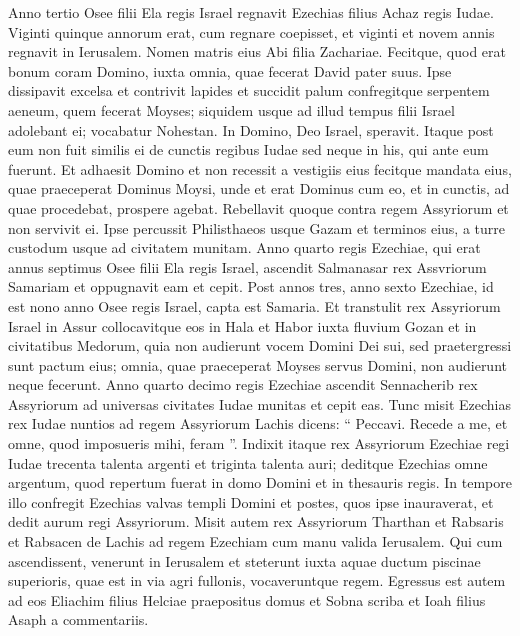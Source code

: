 \begin{biblechapter}
\begin{biblechapter}
\begin{biblechapter}
\begin{biblechapter}
\begin{biblechapter}
\begin{biblechapter}
\begin{biblechapter}
\begin{biblechapter}
\begin{biblechapter}
\begin{biblechapter}
\begin{biblechapter}
\begin{biblechapter}
\begin{biblechapter}
\begin{biblechapter}
\begin{biblechapter}
\begin{biblechapter}
\begin{biblechapter}
\begin{biblechapter}
 \verse Anno tertio Osee filii Ela regis Israel regnavit Ezechias filius Achaz regis Iudae. 
\verse Viginti quinque annorum erat, cum regnare coepisset, et viginti et novem annis regnavit in Ierusalem. Nomen matris eius Abi filia Zachariae. 
\verse Fecitque, quod erat bonum coram Domino, iuxta omnia, quae fecerat David pater suus. 
\verse Ipse dissipavit excelsa et contrivit lapides et succidit palum confregitque serpentem aeneum, quem fecerat Moyses; siquidem usque ad illud tempus filii Israel adolebant ei; vocabatur Nohestan. 
\verse In Domino, Deo Israel, speravit. Itaque post eum non fuit similis ei de cunctis regibus Iudae sed neque in his, qui ante eum fuerunt. 
\verse Et adhaesit Domino et non recessit a vestigiis eius fecitque mandata eius, quae praeceperat Dominus Moysi, 
\verse unde et erat Dominus cum eo, et in cunctis, ad quae procedebat, prospere agebat.
 Rebellavit quoque contra regem Assyriorum et non servivit ei. 
\verse Ipse percussit Philisthaeos usque Gazam et terminos eius, a turre custodum usque ad civitatem munitam.
 \verse Anno quarto regis Ezechiae, qui erat annus septimus Osee filii Ela regis Israel, ascendit Salmanasar rex Assvriorum Samariam et oppugnavit eam 
\verse et cepit. Post annos tres, anno sexto Ezechiae, id est nono anno Osee regis Israel, capta est Samaria. 
\verse Et transtulit rex Assyriorum Israel in Assur collocavitque eos in Hala et Habor iuxta fluvium Gozan et in civitatibus Medorum, 
\verse quia non audierunt vocem Domini Dei sui, sed praetergressi sunt pactum eius; omnia, quae praeceperat Moyses servus Domini, non audierunt neque fecerunt.
 \verse Anno quarto decimo regis Ezechiae ascendit Sennacherib rex Assyriorum ad universas civitates Iudae munitas et cepit eas. 
\verse Tunc misit Ezechias rex Iudae nuntios ad regem Assyriorum Lachis dicens: “ Peccavi. Recede a me, et omne, quod imposueris mihi, feram ”. Indixit itaque rex Assyriorum Ezechiae regi Iudae trecenta talenta argenti et triginta talenta auri; 
\verse deditque Ezechias omne argentum, quod repertum fuerat in domo Domini et in thesauris regis. 
\verse In tempore illo confregit Ezechias valvas templi Domini et postes, quos ipse inauraverat, et dedit aurum regi Assyriorum.
 \verse Misit autem rex Assyriorum Tharthan et Rabsaris et Rabsacen de Lachis ad regem Ezechiam cum manu valida Ierusalem. Qui cum ascendissent, venerunt in Ierusalem et steterunt iuxta aquae ductum piscinae superioris, quae est in via agri fullonis, 
\verse vocaveruntque regem. Egressus est autem ad eos Eliachim filius Helciae praepositus domus et Sobna scriba et Ioah filius Asaph a commentariis.

\end{biblechapter}
\end{biblechapter}
\end{biblechapter}
\end{biblechapter}
\end{biblechapter}
\end{biblechapter}
\end{biblechapter}
\end{biblechapter}
\end{biblechapter}
\end{biblechapter}
\end{biblechapter}
\end{biblechapter}
\end{biblechapter}
\end{biblechapter}
\end{biblechapter}
\end{biblechapter}
\end{biblechapter}
\end{biblechapter}
